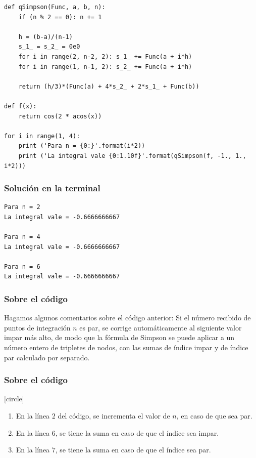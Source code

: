 \begin{frame}
\begin{lstlisting}[caption=Código para el método de Simpson, style=FormattedNumber, basicstyle=\linespread{1.1}\ttfamily=\small, columns=fullflexible]
def qSimpson(Func, a, b, n):
    if (n % 2 == 0): n += 1
 
    h = (b-a)/(n-1)
    s_1_ = s_2_ = 0e0
    for i in range(2, n-2, 2): s_1_ += Func(a + i*h)
    for i in range(1, n-1, 2): s_2_ += Func(a + i*h)
 
    return (h/3)*(Func(a) + 4*s_2_ + 2*s_1_ + Func(b))

def f(x):
    return cos(2 * acos(x))

for i in range(1, 4):
    print ('Para n = {0:}'.format(i*2))
    print ('La integral vale {0:1.10f}'.format(qSimpson(f, -1., 1., i*2)))
\end{lstlisting}
\end{frame}
\begin{frame}[fragile]
\frametitle{Solución en la terminal}
\begin{verbatim}
Para n = 2
La integral vale = -0.6666666667

Para n = 4
La integral vale = -0.6666666667

Para n = 6
La integral vale = -0.6666666667
\end{verbatim}
\end{frame}
\begin{frame}
\frametitle{Sobre el código}
Hagamos algunos comentarios sobre el código anterior: Si el número recibido de puntos de integración $n$ es par, se corrige automáticamente al siguiente valor impar más alto, de modo que la fórmula de Simpson se puede aplicar a un número entero de tripletes de nodos, con las sumas de índice impar y de índice par calculado por separado.
\end{frame}
\begin{frame}
\frametitle{Sobre el código}
[circle]
\begin{enumerate}[<+->]
\item En la línea $2$ del código, se incrementa el valor de $n$, en caso de que sea par.
\item En la línea $6$, se tiene la suma en caso de que el índice sea impar.
\item En la línea $7$, se tiene la suma en caso de que el índice sea par.
\end{enumerate}
\end{frame}

